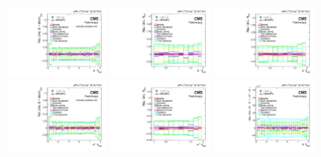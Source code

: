 \begin{figure}[!htbp]
 \begin{center}
  \includegraphics[width=0.30\textwidth]{Figures/WBoson/Analysis/Systematics/Combined/PA/Cross_Section/gr_WToMuMi_PA_Cross_Section_EffTnP.pdf}
  \includegraphics[width=0.30\textwidth]{Figures/WBoson/Analysis/Systematics/Combined/PA/ForwardBackward_Ratio/gr_WToMuMi_PA_ForwardBackward_Ratio_EffTnP.pdf}
  \includegraphics[width=0.30\textwidth]{Figures/WBoson/Analysis/Systematics/Combined/PA/ForwardBackward_Ratio/gr_WToMuInc_PA_ForwardBackward_Ratio_EffTnP.pdf}
  \includegraphics[width=0.30\textwidth]{Figures/WBoson/Analysis/Systematics/Combined/PA/Cross_Section/gr_WToMuPl_PA_Cross_Section_EffTnP.pdf}
  \includegraphics[width=0.30\textwidth]{Figures/WBoson/Analysis/Systematics/Combined/PA/ForwardBackward_Ratio/gr_WToMuPl_PA_ForwardBackward_Ratio_EffTnP.pdf}
  \includegraphics[width=0.30\textwidth]{Figures/WBoson/Analysis/Systematics/Combined/PA/Charge_Asymmetry/gr_WToMuInc_PA_Charge_Asymmetry_EffTnP.pdf}

\end{center}
\end{figure}
